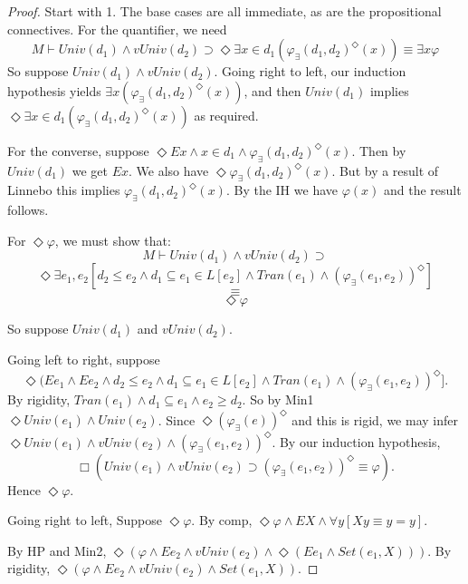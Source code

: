 \documentclass{article}
\begin{document}
    \begin{proof}
        Start with 1.
        The base cases are all immediate, as are the propositional connectives. 
        For the quantifier, we need 
        $$M \vdash Univ(d_1) \wedge vUniv(d_2) \supset 
        \Diamond \exists x \in d_1(\varphi_\exists(d_1, d_2)^\Diamond(x)) 
        \equiv 
        \exists x \varphi$$
        So suppose $Univ(d_1) \wedge vUniv(d_2)$. 
        Going right to left, our induction hypothesis 
        yields $\exists x (\varphi_\exists(d_1, d_2)^\Diamond(x))$, 
        and then $Univ(d_1)$ 
        implies $\Diamond \exists x \in d_1 (\varphi_\exists(d_1, d_2)^\Diamond(x))$ as 
        required. 
    
        For the converse, suppose 
        $\Diamond Ex \wedge x \in d_1 \wedge \varphi_\exists(d_1, d_2)^\Diamond(x)$.
        Then by $Univ(d_1)$ we get $Ex$. 
        We also have $\Diamond \varphi_\exists(d_1, d_2)^\Diamond(x)$.
        But by a result of Linnebo this implies $\varphi_\exists(d_1, d_2)^\Diamond(x)$.
        By the IH we have $\varphi(x)$ and the result follows.
    
        For $\Diamond \varphi$, we must show that:
        $$M \vdash Univ(d_1) \wedge vUniv(d_2) \supset $$
        $$\Diamond \exists e_1, e_2[d_2 \leq e_2 \wedge d_1 \subseteq e_1 \in L[e_2] \wedge Tran(e_1) \wedge (\varphi_\exists(e_1, e_2))^\Diamond]$$
        $$\equiv $$
        $$\Diamond \varphi$$
    
        So suppose $Univ(d_1)$ and $vUniv(d_2)$. 
        
        Going left to right, suppose
        $$\Diamond (Ee_1 \wedge Ee_2  \wedge d_2 \leq e_2 \wedge d_1 \subseteq e_1 \in L[e_2] \wedge Tran(e_1) \wedge (\varphi_\exists(e_1, e_2))^\Diamond].$$
        By rigidity, $Tran(e_1) \wedge d_1 \subseteq e_1 \wedge e_2 \geq d_2$. 
        So by Min1 $\Diamond Univ(e_1) \wedge Univ(e_2)$.
        Since
        $\Diamond (\varphi_\exists(e))^\Diamond$ and this is rigid, we may infer 
        $\Diamond Univ(e_1) \wedge vUniv(e_2) \wedge (\varphi_\exists(e_1, e_2))^\Diamond$.
        By our induction hypothesis, 
        $$\Box (Univ(e_1) \wedge vUniv(e_2) \supset (\varphi_\exists(e_1, e_2))^\Diamond \equiv \varphi).$$
        Hence $\Diamond \varphi$. 
        
        Going right to left,
        Suppose $\Diamond \varphi$. By comp, 
        $\Diamond \varphi \wedge EX \wedge \forall y[Xy \equiv y = y]$.

        By HP and Min2, 
        $\Diamond (\varphi \wedge Ee_2 \wedge vUniv(e_2) \wedge \Diamond (Ee_1 \wedge Set(e_1, X)))$.
        By rigidity, $\Diamond (\varphi \wedge Ee_2 \wedge vUniv(e_2) \wedge Set(e_1, X))$.
    

\end{proof}
\end{document}
